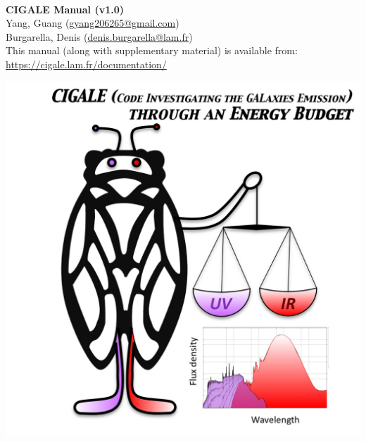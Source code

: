 \documentclass[12pt]{article}
\begin{document}

\begin{titlepage}
\begin{flushright}
\LARGE{\textbf{}}\\
\vfill
\Huge{\textbf{CIGALE Manual (v1.0)}}\\
    \vfill
    \large Yang, Guang (\url{gyang206265@gmail.com})\\
    \large Burgarella, Denis (\url{denis.burgarella@lam.fr})\\
\vfill
\normalsize This manual (along with supplementary material) is available from:\\
\url{https://cigale.lam.fr/documentation/} \\
\vfill

\includegraphics[width=0.5\linewidth]{CIGALE_Logo.jpg}\\ 
 
  
\end{flushright}
\end{titlepage}
\end{document}
